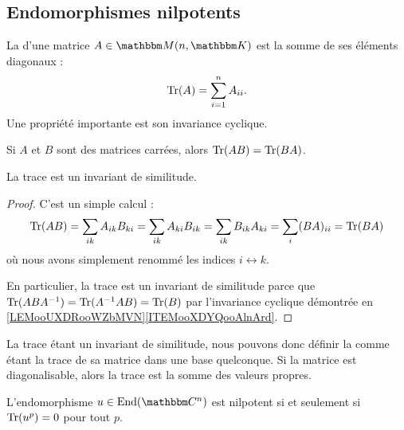 \subsection{Endomorphismes nilpotents}

La  d'une matrice \( A\in \eM(n,\eK)\) est la somme de ses éléments diagonaux :
\begin{equation}
    \operatorname{Tr}(A)=\sum_{i=1}^nA_{ii}.
\end{equation}
Une propriété importante est son invariance cyclique.
\begin{lemma}   \label{LemhbZTay}
    Si \( A\) et \( B\) sont des matrices carrées, alors \( \operatorname{Tr}(AB)=\operatorname{Tr}(BA)\).

    La trace est un invariant de similitude.
\end{lemma}

\begin{proof}
    C'est un simple calcul :
    \begin{equation}
            \operatorname{Tr}(AB)=\sum_{ik}A_{ik}B_{ki}
            =\sum_{ik}A_{ki}B_{ik}
            =\sum_{ik}B_{ik}A_{ki}
            =\sum_i(BA)_{ii}
            =\operatorname{Tr}(BA)
    \end{equation}
    où nous avons simplement renommé les indices \( i\leftrightarrow k\).

    En particulier, la trace est un invariant de similitude parce que \( \operatorname{Tr}(ABA^{-1})=\operatorname{Tr}(A^{-1} AB)=\operatorname{Tr}(B)\)  par l'invariance cyclique démontrée en \ref{LEMooUXDRooWZbMVN}\ref{ITEMooXDYQooAlnArd}.
\end{proof}
La trace étant un invariant de similitude, nous pouvons donc définir la  comme étant la trace de sa matrice dans une base quelconque. Si la matrice est diagonalisable, alors la trace est la somme des valeurs propres.

\begin{lemma}   \label{LemzgNOjY}
    L'endomorphisme \( u\in\End(\eC^n)\) est nilpotent si et seulement si \( \operatorname{Tr}(u^p)=0\) pour tout \( p\).
\end{lemma}

